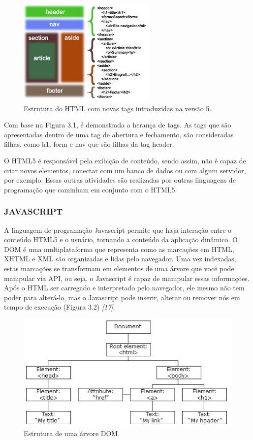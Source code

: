 \documentclass[
  12pt,				%
  openany,
  oneside,
  a4paper,			%
  english,			%
  brazil
]{article}
\numberwithin{figure}{section}
\numberwithin{table}{section}
\begin{document}
\begin{figure}[!h]
\centering
\includegraphics[width=0.6\textwidth]{figura31}
\caption{Estrutura do HTML com novas tags introduzidas na versão 5.}
\end{figure}

Com base na Figura 3.1, é demonstrada a herança de tags. As tags que são apresentadas dentro de uma tag de abertura e fechamento, são consideradas filhas, como h1, form e nav que são filhas da tag header.

O HTML5 é responsável pela exibição de conteúdo, sendo assim, não é capaz de criar novos elementos, conectar com um banco de dados ou com algum servidor, por exemplo. Essas outras atividades são realizadas por outras linguagens de programação que caminham em conjunto com o HTML5.



\subsubsection{JAVASCRIPT}


A linguagem de programação Javascript permite que haja interação entre o conteúdo HTML5 e o usuário, tornando a conteúdo da aplicação dinâmico. O DOM é uma multiplataforma que representa como as marcações em HTML, XHTML e XML são organizadas e lidas pelo navegador. Uma vez indexadas, estas marcações se transformam em elementos de uma árvore que você pode manipular via API, ou seja, o Javascript é capaz de manipular essas informações. Após o HTML ser carregado e interpretado pelo navegador, ele mesmo não tem poder para alterá-lo, mas o Javascript pode inserir, alterar ou remover nós em tempo de execução (Figura 3.2) \textit{[17]}.

\begin{figure}[!h]
\centering
\includegraphics[width=1\textwidth]{figura32}
\caption{Estrutura de uma árvore DOM.}
\end{figure}
\end{document}
